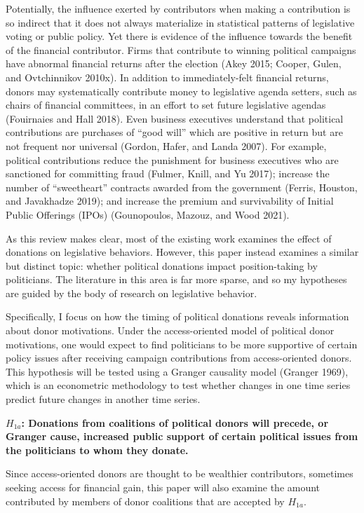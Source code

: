 \documentclass[12pt,]{article}
\begin{document}
Potentially, the influence exerted by contributors when making a
contribution is so indirect that it does not always materialize in
statistical patterns of legislative voting or public policy. Yet there
is evidence of the influence towards the benefit of the financial
contributor. Firms that contribute to winning political campaigns have
abnormal financial returns after the election (Akey 2015; Cooper, Gulen,
and Ovtchinnikov 2010x). In addition to immediately-felt financial
returns, donors may systematically contribute money to legislative
agenda setters, such as chairs of financial committees, in an effort to
set future legislative agendas (Fouirnaies and Hall 2018). Even business
executives understand that political contributions are purchases of
``good will'' which are positive in return but are not frequent nor
universal (Gordon, Hafer, and Landa 2007). For example, political
contributions reduce the punishment for business executives who are
sanctioned for committing fraud (Fulmer, Knill, and Yu 2017); increase
the number of ``sweetheart'' contracts awarded from the government
(Ferris, Houston, and Javakhadze 2019); and increase the premium and
survivability of Initial Public Offerings (IPOs) (Gounopoulos, Mazouz,
and Wood 2021).

As this review makes clear, most of the existing work examines the
effect of donations on legislative behaviors. However, this paper
instead examines a similar but distinct topic: whether political
donations impact position-taking by politicians. The literature in this
area is far more sparse, and so my hypotheses are guided by the body of
research on legislative behavior.

Specifically, I focus on how the timing of political donations reveals
information about donor motivations. Under the access-oriented model of
political donor motivations, one would expect to find politicians to be
more supportive of certain policy issues after receiving campaign
contributions from access-oriented donors. This hypothesis will be
tested using a Granger causality model (Granger 1969), which is an
econometric methodology to test whether changes in one time series
predict future changes in another time series.

\textbf{\(H_{1a}\): Donations from coalitions of political donors will
precede, or Granger cause, increased public support of certain political
issues from the politicians to whom they donate.}

Since access-oriented donors are thought to be wealthier contributors,
sometimes seeking access for financial gain, this paper will also
examine the amount contributed by members of donor coalitions that are
accepted by \(H_{1a}\).
\end{document}
